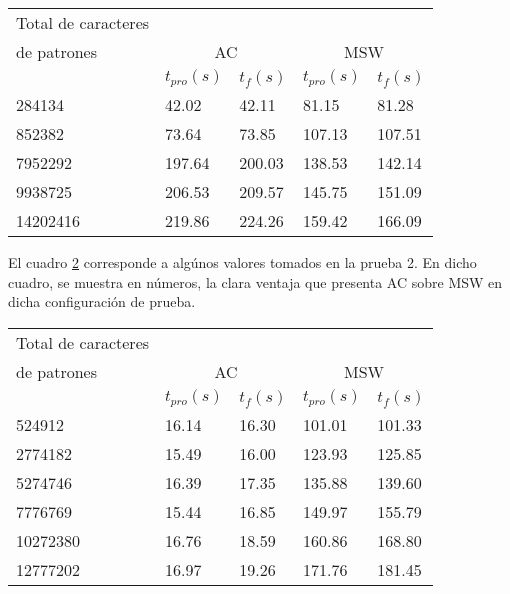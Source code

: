 {\begin{table}[H]
\begin{center}
\scalebox{0.7} {
\begin{tabular}{lllll}
\hline
  Total de caracteres\\ de patrones & \multicolumn{2}{c}{AC} & \multicolumn{2}{c}{MSW}\\

 & $t_{pro}(s)$ & $t_{f}(s)$
 & $t_{pro}(s)$ & $t_{f}(s)$ \\
  \midrule
    284134&42.02&42.11&81.15&81.28\\
    852382&73.64&73.85&107.13&107.51\\
    7952292&197.64&200.03&138.53&142.14\\
    9938725&206.53&209.57&145.75&151.09\\
    14202416&219.86&224.26&159.42&166.09\\
  \bottomrule
\end{tabular}
}
\label{tab:Total1} 
\end{center}
\end{table}

El cuadro \ref{tab:Total2} corresponde a algúnos valores tomados en la prueba 2. En dicho cuadro, se muestra en números, la clara ventaja que presenta AC sobre MSW en dicha configuración de prueba.
\begin{table}[H]
\begin{center}
\scalebox{0.7} {
\begin{tabular}{lllll}
\hline
  Total de caracteres\\ de patrones & \multicolumn{2}{c}{AC} & \multicolumn{2}{c}{MSW}\\

 & $t_{pro}(s)$ & $t_{f}(s)$
 & $t_{pro}(s)$ & $t_{f}(s)$ \\
  \midrule
    524912&16.14&16.30&101.01&101.33\\
    2774182&15.49&16.00&123.93&125.85\\
    5274746&16.39&17.35&135.88&139.60\\
    7776769&15.44&16.85&149.97&155.79\\
    10272380&16.76&18.59&160.86&168.80\\
	12777202&16.97&19.26&171.76&181.45\\
  \bottomrule
\end{tabular}
}
 \label{tab:Total2}
\end{center}
\end{table}
  
}
